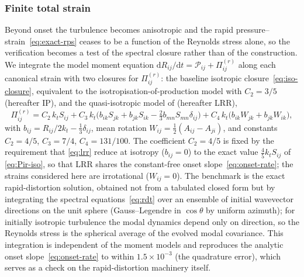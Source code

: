 \documentclass[lineno]{JFM-FLM_Au}
\begin{document}
\subsubsection{Finite total strain}\label{sec:finite-strain}

Beyond onset the turbulence becomes anisotropic and the rapid
pressure--strain~\eqref{eq:exact-rps} ceases to be a function of the
Reynolds stress alone, so the verification becomes a test of the spectral
closure rather than of the construction. We integrate the model moment
equation $\mathrm{d}R_{ij}/\mathrm{d}t=\mathcal{P}_{ij}+\Pi_{ij}^{(r)}$
along each canonical strain with two closures for $\Pi_{ij}^{(r)}$: the
baseline isotropic closure~\eqref{eq:iso-closure}, equivalent to the
isotropisation-of-production model with $C_2=3/5$ (hereafter IP), and the
quasi-isotropic model of \citet{LaunderReeceRodi1975} (hereafter LRR),
\begin{equation}
  \Pi_{ij}^{(r)} = C_2\,k_t S_{ij}
  + C_3\,k_t\big(b_{ik}S_{jk}+b_{jk}S_{ik}-\tfrac{2}{3}b_{mn}S_{mn}\delta_{ij}\big)
  + C_4\,k_t\big(b_{ik}W_{jk}+b_{jk}W_{ik}\big),
  \label{eq:lrr}
\end{equation}
with $b_{ij}=R_{ij}/2k_t-\tfrac13\delta_{ij}$, mean rotation
$W_{ij}=\tfrac12(A_{ij}-A_{ji})$, and constants $C_2=4/5$, $C_3=7/4$,
$C_4=131/100$. The coefficient $C_2=4/5$ is fixed by the requirement that
\eqref{eq:lrr} reduce at isotropy ($b_{ij}=0$) to the exact value
$\tfrac45 k_t S_{ij}$ of \eqref{eq:Pir-iso}, so that LRR shares the
constant-free onset slope~\eqref{eq:onset-rate}; the strains considered
here are irrotational ($W_{ij}=0$). The benchmark is the exact
rapid-distortion solution, obtained not from a tabulated closed form but by
integrating the spectral equations~\eqref{eq:rdt} over an ensemble of
initial wavevector directions on the unit sphere (Gauss--Legendre in
$\cos\theta$ by uniform azimuth); for initially isotropic turbulence the
modal dynamics depend only on direction, so the Reynolds stress is the
spherical average of the evolved modal covariance. This integration is
independent of the moment models and reproduces the analytic onset
slope~\eqref{eq:onset-rate} to within $1.5\times10^{-3}$ (the quadrature
error), which serves as a check on the rapid-distortion machinery itself.
\end{document}
